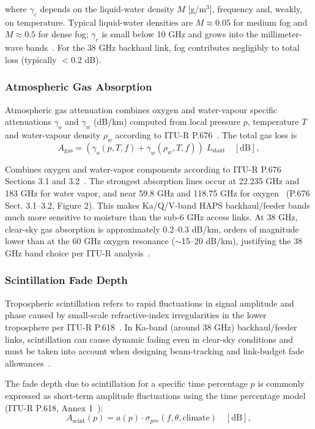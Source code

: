 \documentclass[conference]{IEEEtran}
\begin{document}
where $\gamma_c$ depends on the liquid-water density $M$ [g/m$^3$], frequency
and, weakly, on temperature. Typical liquid-water densities are $M\approx0.05$ for
medium fog and $M\approx0.5$ for dense fog; $\gamma_c$ is small below 10 GHz and
grows into the millimeter-wave bands~\cite{itu_p840}. For the 38 GHz backhaul link,
fog contributes negligibly to total loss (typically $<$0.2 dB).

\subsubsection{Atmospheric Gas Absorption~\cite{itu_p676}}
Atmospheric gas attenuation combines oxygen and water-vapour specific
attenuations $\gamma_o$ and $\gamma_w$ (dB/km) computed from
local pressure $p$, temperature $T$ and water-vapour density $\rho_w$ according to ITU-R P.676~\cite{itu_p676}.
The total gas loss is
\begin{equation}
A_\mathrm{gas} = (\gamma_o(p,T,f) + \gamma_w(\rho_w,T,f))\;L_\mathrm{slant} \quad [\mathrm{dB}],
\label{eq:gas_loss}
\end{equation}

Combines oxygen and water-vapor components according to ITU-R P.676 Sections 3.1 and 3.2~\cite{itu_p676}. The strongest absorption lines occur at 22.235 GHz and 183 GHz for water
vapor, and near 59.8 GHz and 118.75 GHz for oxygen~\cite{itu_p676} (P.676 Sect. 3.1--3.2, Figure 2).
This makes Ka/Q/V-band HAPS backhaul/feeder bands much more sensitive to moisture than the sub-6 GHz access links.
At 38 GHz, clear-sky gas absorption is approximately 0.2--0.3 dB/km, orders of magnitude lower than
at the 60 GHz oxygen resonance ($\sim$15--20 dB/km), justifying the 38 GHz band choice per ITU-R analysis~\cite{itu_p676}.

\subsubsection{Scintillation Fade Depth~\cite{itu_p618}}
Tropospheric scintillation refers to rapid fluctuations in signal amplitude and
phase caused by small-scale refractive-index irregularities in the lower
troposphere per ITU-R P.618~\cite{itu_p618}. In Ka-band (around 38 GHz) backhaul/feeder links, scintillation can cause
dynamic fading even in clear-sky conditions and must be taken into account when
designing beam-tracking and link-budget fade allowances~\cite{itu_p618}.

The fade depth due to scintillation for a specific time percentage $p$ is
commonly expressed as short-term amplitude fluctuations using the time percentage model (ITU-R P.618, Annex 1~\cite{itu_p618}):
\begin{equation}
A_\mathrm{scint}(p) = a(p) \cdot \sigma_{pre}(f,\theta,\mathrm{climate}) \quad [\mathrm{dB}],
\label{eq:scint_loss}
\end{equation}
\end{document}
